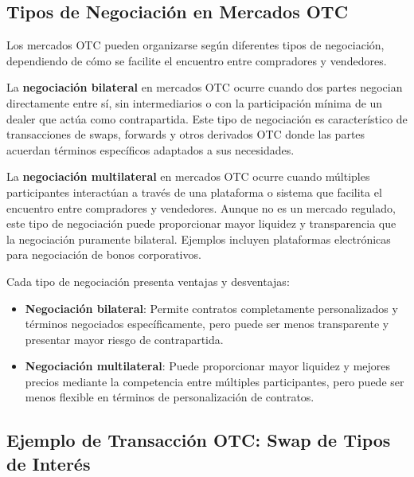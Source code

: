 \subsection{Tipos de Negociación en Mercados OTC}

Los mercados OTC pueden organizarse según diferentes tipos de negociación, dependiendo de cómo se facilite el encuentro entre compradores y vendedores.

\begin{definicion}
La \textbf{negociación bilateral} en mercados OTC ocurre cuando dos partes negocian directamente entre sí, sin intermediarios o con la participación mínima de un dealer que actúa como contrapartida. Este tipo de negociación es característico de transacciones de swaps, forwards y otros derivados OTC donde las partes acuerdan términos específicos adaptados a sus necesidades.
\end{definicion}

\begin{definicion}
La \textbf{negociación multilateral} en mercados OTC ocurre cuando múltiples participantes interactúan a través de una plataforma o sistema que facilita el encuentro entre compradores y vendedores. Aunque no es un mercado regulado, este tipo de negociación puede proporcionar mayor liquidez y transparencia que la negociación puramente bilateral. Ejemplos incluyen plataformas electrónicas para negociación de bonos corporativos.
\end{definicion}

\begin{proposicion}
Cada tipo de negociación presenta ventajas y desventajas:
\begin{itemize}
\item \textbf{Negociación bilateral}: Permite contratos completamente personalizados y términos negociados específicamente, pero puede ser menos transparente y presentar mayor riesgo de contrapartida.
\item \textbf{Negociación multilateral}: Puede proporcionar mayor liquidez y mejores precios mediante la competencia entre múltiples participantes, pero puede ser menos flexible en términos de personalización de contratos.
\end{itemize}
\end{proposicion}

\subsection{Ejemplo de Transacción OTC: Swap de Tipos de Interés}

